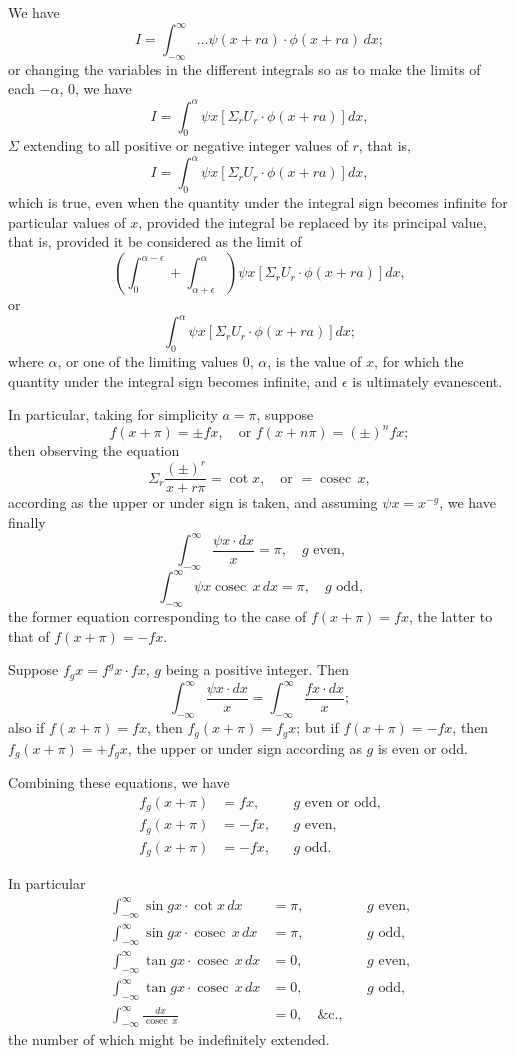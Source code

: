 \documentclass[11pt,a4paper]{article}
\DeclareMathOperator{\cosec}{cosec}
\theoremstyle{plain}
\begin{document}
We have
\[I = \int_{-\infty}^{\infty} \ldots \psi(x+ra) \cdot \phi(x+ra) \, dx;\]
or changing the variables in the different integrals so as to make the limits of each $-\alpha$, $0$, we have
\[I = \int_0^{\alpha} \psi x \left[\Sigma_r U_r \cdot \phi(x+ra)\right] dx,\]
$\Sigma$ extending to all positive or negative integer values of $r$, that is,
\begin{equation}I = \int_0^{\alpha} \psi x \left[\Sigma_r U_r \cdot \phi(x+ra)\right] dx,\tag{A}\end{equation}
which is true, even when the quantity under the integral sign becomes infinite for particular values of $x$, provided the integral be replaced by its principal value, that is, provided it be considered as the limit of
\[\left(\int_0^{\alpha-\epsilon} + \int_{\alpha+\epsilon}^{\alpha}\right) \psi x \left[\Sigma_r U_r \cdot \phi(x+ra)\right] dx,\]
or
\[\int_0^{\alpha} \psi x \left[\Sigma_r U_r \cdot \phi(x+ra)\right] dx;\]
where $\alpha$, or one of the limiting values $0$, $\alpha$, is the value of $x$, for which the quantity under the integral sign becomes infinite, and $\epsilon$ is ultimately evanescent.

In particular, taking for simplicity $a=\pi$, suppose
\[f(x+\pi) = \pm fx, \quad \text{or } f(x+n\pi) = (\pm)^n fx;\]
then observing the equation
\[\Sigma_r \frac{(\pm)^r}{x+r\pi} = \cot x, \quad \text{or } = \cosec\, x,\]
according as the upper or under sign is taken, and assuming $\psi x = x^{-g}$, we have finally
\[\int_{-\infty}^{\infty} \frac{\psi x \cdot dx}{x} = \pi, \quad g \text{ even,}\]
\[\int_{-\infty}^{\infty} \psi x \cosec\, x \, dx = \pi, \quad g \text{ odd,}\]
the former equation corresponding to the case of $f(x+\pi) = fx$, the latter to that of $f(x+\pi) = -fx$.

Suppose $f_g x = f^g x \cdot fx$, $g$ being a positive integer. Then
\[\int_{-\infty}^{\infty} \frac{\psi x \cdot dx}{x} = \int_{-\infty}^{\infty} \frac{fx \cdot dx}{x};\]
also if $f(x+\pi) = fx$, then $f_g(x+\pi) = f_g x$; but if $f(x+\pi) = -fx$, then $f_g(x+\pi) = +f_g x$, the upper or under sign according as $g$ is even or odd.

Combining these equations, we have
\begin{align*}
f_g(x+\pi) &= fx, && g \text{ even or odd,}\\
f_g(x+\pi) &= -fx, && g \text{ even,}\\
f_g(x+\pi) &= -fx, && g \text{ odd.}
\end{align*}

In particular
\begin{align*}
\int_{-\infty}^{\infty} \sin gx \cdot \cot x \, dx &= \pi, && g \text{ even,}\\
\int_{-\infty}^{\infty} \sin gx \cdot \cosec\, x \, dx &= \pi, && g \text{ odd,}\\
\int_{-\infty}^{\infty} \tan gx \cdot \cosec\, x \, dx &= 0, && g \text{ even,}\\
\int_{-\infty}^{\infty} \tan gx \cdot \cosec\, x \, dx &= 0, && g \text{ odd,}\\
\int_{-\infty}^{\infty} \frac{dx}{\cosec\, x} &= 0, \quad \&\text{c.},
\end{align*}
the number of which might be indefinitely extended.
\end{document}
